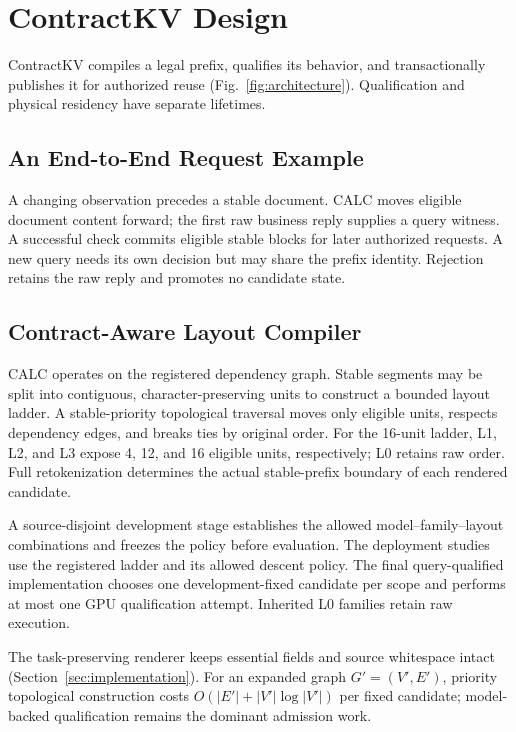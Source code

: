 \section{ContractKV Design}
\label{sec:design}

ContractKV compiles a legal prefix, qualifies its behavior, and transactionally publishes it for authorized reuse (Fig.~\ref{fig:architecture}). Qualification and physical residency have separate lifetimes.




\subsection{An End-to-End Request Example}
A changing observation precedes a stable document. CALC moves eligible document content forward; the first raw business reply supplies a query witness. A successful check commits eligible stable blocks for later authorized requests. A new query needs its own decision but may share the prefix identity. Rejection retains the raw reply and promotes no candidate state.

\subsection{Contract-Aware Layout Compiler}
\label{sec:calc}
CALC operates on the registered dependency graph. Stable segments may be split into contiguous, character-preserving units to construct a bounded layout ladder. A stable-priority topological traversal moves only eligible units, respects dependency edges, and breaks ties by original order. For the 16-unit ladder, L1, L2, and L3 expose 4, 12, and 16 eligible units, respectively; L0 retains raw order. Full retokenization determines the actual stable-prefix boundary of each rendered candidate.

A source-disjoint development stage establishes the allowed model--family--layout combinations and freezes the policy before evaluation. The deployment studies use the registered ladder and its allowed descent policy. The final query-qualified implementation chooses one development-fixed candidate per scope and performs at most one GPU qualification attempt. Inherited L0 families retain raw execution.

The task-preserving renderer keeps essential fields and source whitespace intact (Section~\ref{sec:implementation}). For an expanded graph $G'=(V',E')$, priority topological construction costs $O(|E'|+|V'|\log|V'|)$ per fixed candidate; model-backed qualification remains the dominant admission work.

